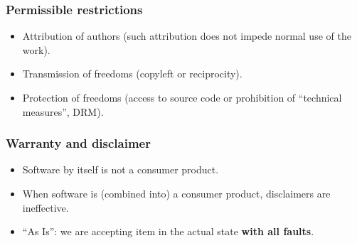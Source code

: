 






\begin{frame}
\frametitle{Permissible restrictions}
\begin{itemize}
    \item Attribution of authors (such attribution does not impede normal use of the work).
    \item Transmission of freedoms (copyleft or reciprocity).
    \item Protection of freedoms (access to source code or prohibition of ``technical measures'', DRM). 
\end{itemize}

\end{frame}

\begin{frame}
\frametitle{Warranty and disclaimer}
\begin{itemize}
    \item Software by itself is not a consumer product.
    \item When software is (combined into) a consumer product, disclaimers are ineffective.
    \item ``As Is'': we are accepting item in the actual state \textbf{with all faults}.
\end{itemize}

\end{frame}
 
